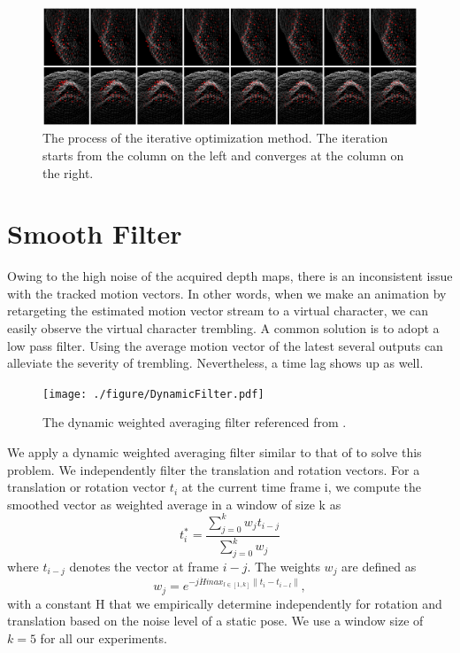 \begin{figure}
\centering
\includegraphics[width=1.0\linewidth]{./figure/ICP_Nose_Hilight1.png}
\caption{The process of the iterative optimization method. The iteration starts from the column on the left and converges at the column on the right.}
\label{f:icp nose}
\end{figure}

\section{Smooth Filter}
\label{s:smooth filter}
Owing to the high noise of the acquired depth maps, there is an inconsistent issue with the tracked motion vectors. In other words, when we make an animation by retargeting the estimated motion vector stream to a virtual character, we can easily observe the virtual character trembling. A common solution is to adopt a low pass filter. Using the average motion vector of the latest several outputs can alleviate the severity of trembling. Nevertheless, a time lag shows up as well. 
\begin{figure}
\centering
\texttt{[image: ./figure/DynamicFilter.pdf]}
\caption{The dynamic weighted averaging filter referenced from \cite{Weise:11:RPBFA}.}
\label{f:dynamic filter}
\end{figure}
We apply a dynamic weighted averaging filter similar to that of \cite{Weise:11:RPBFA} to solve this problem. We independently filter the translation and rotation vectors. For a translation or rotation vector $t_{i}$ at the current time frame i, we compute the smoothed vector as weighted average in a window of size k as
\begin{equation}
t_{i}^{*}=\dfrac{\sum_{j=0}^{k}w_{j}t_{i-j}}{\sum_{j=0}^{k}w_{j}}
\end{equation}
where $t_{i-j}$ denotes the vector at frame $i-j$. The weights $w_{j}$ are defined as
\begin{equation}
w_{j}=e^{-j\dot H\dot max_{l\in [1,k]}\parallel t_{i}-t_{i-l} \parallel},
\end{equation}
with a constant H that we empirically determine independently for rotation and translation based on the noise level of a static pose. We use a window size of $k=5$ for all our experiments.